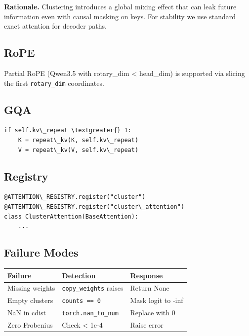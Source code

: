 \textbf{Rationale.} Clustering introduces a global mixing effect that can leak 
future information even with causal masking on keys. For stability we 
use standard exact attention for decoder paths.

\subsection{RoPE}

Partial RoPE (Qwen3.5 with rotary\_dim \textless{} head\_dim) is supported via slicing 
the first \texttt{rotary\_dim} coordinates.

\subsection{GQA}

\begin{lstlisting}
if self.kv\_repeat \textgreater{} 1:
    K = repeat\_kv(K, self.kv\_repeat)
    V = repeat\_kv(V, self.kv\_repeat)
\end{lstlisting}

\subsection{Registry}

\begin{lstlisting}
@ATTENTION\_REGISTRY.register("cluster")
@ATTENTION\_REGISTRY.register("cluster\_attention")
class ClusterAttention(BaseAttention):
    ...
\end{lstlisting}

\subsection{Failure Modes}

\begin{table}[H]
\centering
\small
\begin{tabular}{lll}
\toprule
\textbf{Failure} & \textbf{Detection} & \textbf{Response} \\
\midrule
Missing weights & \texttt{copy\_weights} raises & Return None \\
Empty clusters & \texttt{counts == 0} & Mask logit to -inf \\
NaN in cdist & \texttt{torch.nan\_to\_num} & Replace with 0 \\
Zero Frobenius & Check \textless{} 1e-4 & Raise error \\
\bottomrule
\end{tabular}
\end{table}

